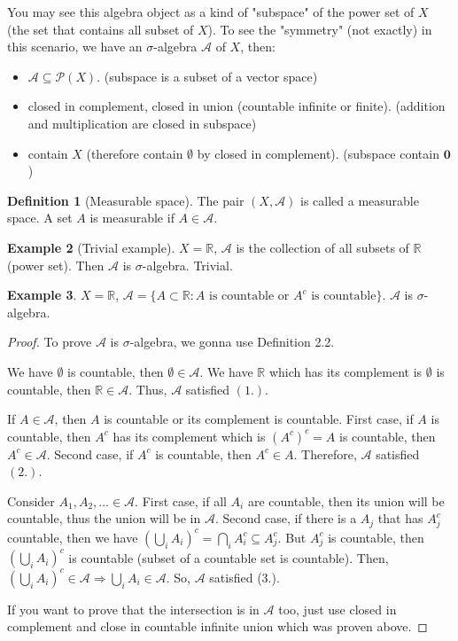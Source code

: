 \documentclass[11pt,a4paper]{article}
\theoremstyle{definition}
\newtheorem{definition}{Definition}[section]
\newtheorem{example}[definition]{Example}
\theoremstyle{plain}
\newcommand{\R}{\mathbb{R}}
\newcommand{\A}{\mathcal{A}}
\begin{document}
\begin{mynote}
You may see this algebra object as a kind of "subspace" of the power set of $X$ (the set that contains all subset of $X$). To see the "symmetry" (not exactly) in this scenario, we have an $\sigma$-algebra $\A$ of $X$, then:
\begin{itemize}
    \item $\A \subseteq \mathcal{P}(X)$. (subspace is a subset of a vector space)
    \item closed in complement, closed in union (countable infinite or finite). (addition and multiplication are closed in subspace)
    \item contain $X$ (therefore contain $\emptyset$ by closed in complement). (subspace contain $\mathbf{0}$)
\end{itemize}
\end{mynote}

\begin{definition}[Measurable space]
The pair $(X, \A)$ is called a measurable space. A set $A$ is measurable if $A \in \A$.
\end{definition}

\begin{example}[Trivial example]
$X=\R$, $\A$ is the collection of all subsets of $\R$ (power set). Then $\A$ is $\sigma$-algebra. Trivial.
\end{example}

\begin{example}
$X=\R$, $\A = \{A\subset\R: A \text{ is countable or } A^c \text{ is countable} \}$. $\A$ is $\sigma$-algebra.
\end{example}

\begin{proof}

To prove $\A$ is $\sigma$-algebra, we gonna use Definition 2.2.

We have $\emptyset$ is countable, then $\emptyset \in \A$. We have $\R$ which has its complement is $\emptyset$ is countable, then $\R \in \A$. Thus, $\A$ satisfied $(1.)$.

If $A \in \A$, then $A$ is countable or its complement is countable. First case, if $A$ is countable, then $A^c$ has its complement which is $(A^c)^c=A$ is countable, then $A^c\in \A$. Second case, if $A^c$ is countable, then $A^c \in A$. Therefore, $\A$ satisfied $(2.)$.

Consider $A_1, A_2,... \in \A$. First case, if all $A_i$ are countable, then its union will be countable, thus the union will be in $\A$. Second case, if there is a $A_j$ that has $A^c_j$ countable, then we have $(\bigcup_iA_i)^c=\bigcap_iA_i^c\subseteq A_j^c$. But $A_j^c$ is countable, then $(\bigcup_iA_i)^c$ is countable (subset of a countable set is countable). Then, $(\bigcup_iA_i)^c \in \A \Rightarrow \bigcup_iA_i \in \A$. So, $\A$ satisfied (3.).

If you want to prove that the intersection is in $\A$ too, just use closed in complement and close in countable infinite union which was proven above.
\end{proof}
\end{document}
